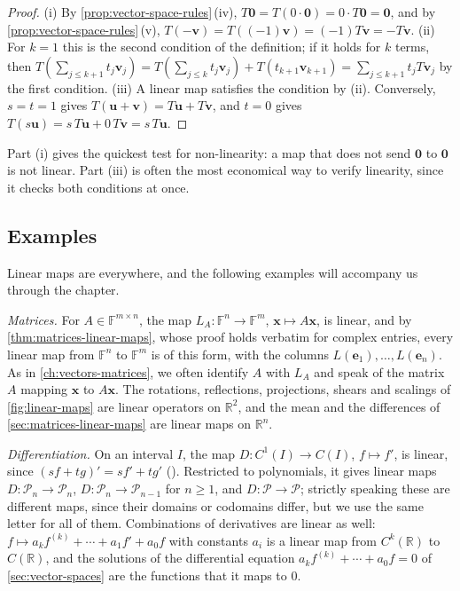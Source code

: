 \begin{proof}
(i) By \cref{prop:vector-space-rules}\,(iv), $T\mathbf 0=T(0\cdot\mathbf 0)=0\cdot T\mathbf 0=\mathbf 0$, and by \cref{prop:vector-space-rules}\,(v), $T(-\mathbf v)=T((-1)\mathbf v)=(-1)T\mathbf v=-T\mathbf v$. (ii) For $k=1$ this is the second condition of the definition; if it holds for $k$ terms, then $T(\sum_{j\le k+1}t_j\mathbf v_j)=T(\sum_{j\le k}t_j\mathbf v_j)+T(t_{k+1}\mathbf v_{k+1})=\sum_{j\le k+1}t_jT\mathbf v_j$ by the first condition. (iii) A linear map satisfies the condition by (ii). Conversely, $s=t=1$ gives $T(\mathbf u+\mathbf v)=T\mathbf u+T\mathbf v$, and $t=0$ gives $T(s\mathbf u)=s\,T\mathbf u+0\,T\mathbf v=s\,T\mathbf u$.
\end{proof}

Part (i) gives the quickest test for non-linearity: a map that does not send $\mathbf 0$ to $\mathbf 0$ is not linear. Part (iii) is often the most economical way to verify linearity, since it checks both conditions at once.

\subsection{Examples}

Linear maps are everywhere, and the following examples will accompany us through the chapter.

\emph{Matrices.} For $A\in\mathbb F^{m\times n}$, the map $L_A\colon\mathbb F^n\to\mathbb F^m$, $\mathbf x\mapsto A\mathbf x$, is linear, and by \cref{thm:matrices-linear-maps}, whose proof holds verbatim for complex entries, every linear map from $\mathbb F^n$ to $\mathbb F^m$ is of this form, with the columns $L(\mathbf e_1),\ldots,L(\mathbf e_n)$. As in \cref{ch:vectors-matrices}, we often identify $A$ with $L_A$ and speak of the matrix $A$ mapping $\mathbf x$ to $A\mathbf x$. The rotations, reflections, projections, shears and scalings of \cref{fig:linear-maps} are linear operators on $\mathbb R^2$, and the mean and the differences of \cref{sec:matrices-linear-maps} are linear maps on $\mathbb R^n$.

\emph{Differentiation.} On an interval $I$, the map $D\colon C^1(I)\to C(I)$, $f\mapsto f'$, is linear, since $(sf+tg)'=sf'+tg'$ (). Restricted to polynomials, it gives linear maps $D\colon\mathcal P_n\to\mathcal P_n$, $D\colon\mathcal P_n\to\mathcal P_{n-1}$ for $n\ge1$, and $D\colon\mathcal P\to\mathcal P$; strictly speaking these are different maps, since their domains or codomains differ, but we use the same letter for all of them. Combinations of derivatives are linear as well: $f\mapsto a_kf^{(k)}+\cdots+a_1f'+a_0f$ with constants $a_i$ is a linear map from $C^k(\mathbb R)$ to $C(\mathbb R)$, and the solutions of the differential equation $a_kf^{(k)}+\cdots+a_0f=0$ of \cref{sec:vector-spaces} are the functions that it maps to $0$.

